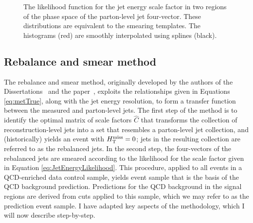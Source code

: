 \begin{figure}[h]
\centering
{}
\caption{The likelihood function for the jet energy scale factor in two regions of the phase space of the parton-level jet four-vector. These distributions are equivalent to the smearing templates. The histograms (red) are smoothly interpolated using splines (black).}
\label{fig:SmearEx}
\end{figure}


\subsection{Rebalance and smear method}
The rebalance and smear method, originally developed by the authors of the Dissertations~\cite{Koay:2011qqa}\cite{Schroder:2012lqa}\cite{Goebel:2015kca} and the paper~\cite{Chatrchyan:2014lfa}, exploits the relationships given in Equations \ref{eq:metTrue}, along with the jet energy resolution, to form a transfer function between the measured and parton-level jets. The first step of the method is to identify the optimal matrix of scale factors $\hat{C}$ that transforms the collection of reconstruction-level jets into a set that resembles a parton-level jet collection, and (historically) yields an event with $H_{\text{T}}^{\rm miss}=0$; jets in the resulting collection are referred to as the rebalanced jets. In the second step, the four-vectors of the rebalanced jets are smeared according to the likelihood for the scale factor given in Equation \ref{eq:JetEnergyLikelihood}. This procedure, applied to all events in a QCD-enriched data control sample, yields event sample that is the basis of the QCD background prediction. Predictions for the QCD background in the signal regions are derived from cuts applied to this sample, which we may refer to as the prediction event sample. I have adapted key aspects of the methodology, which I will now describe step-by-step.

